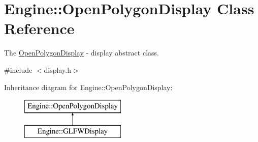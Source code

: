 \hypertarget{classEngine_1_1OpenPolygonDisplay}{}\section{Engine\+:\+:Open\+Polygon\+Display Class Reference}
\label{classEngine_1_1OpenPolygonDisplay}


The \hyperlink{classEngine_1_1OpenPolygonDisplay}{Open\+Polygon\+Display} -\/ display abstract class.  




{\ttfamily \#include $<$display.\+h$>$}

Inheritance diagram for Engine\+:\+:Open\+Polygon\+Display\+:\begin{figure}[H]
\begin{center}
\leavevmode
\includegraphics[height=2.000000cm]{classEngine_1_1OpenPolygonDisplay}
\end{center}
\end{figure}
